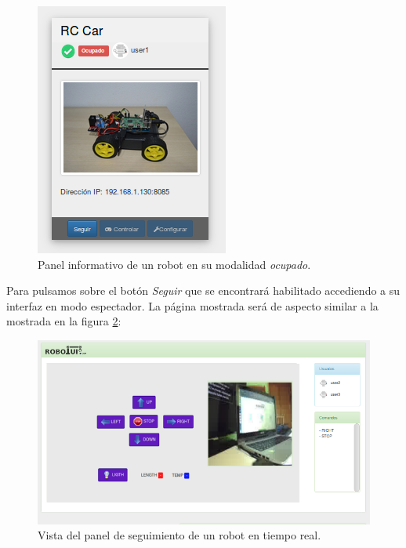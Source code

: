 \begin{figure}[H]
  \begin{center}
    \includegraphics[scale=.8]{imagenes/manual-usuario/tarjeta_ocupado.png}
  \end{center}
  \caption{ Panel informativo de un robot en su modalidad \emph{ocupado}.}
  \label{website:robot-ocupado}
\end{figure}

Para pulsamos sobre el botón \emph{Seguir} que se encontrará habilitado accediendo a su interfaz en modo espectador. La página mostrada será de aspecto similar a la mostrada en la figura \ref{website:ventana-seguimiento}:\\

\begin{figure}[H]
  \begin{center}
    \includegraphics[scale=.55]{imagenes/manual-usuario/vista_seguimiento.png}
  \end{center}
  \caption{ Vista del panel de seguimiento de un robot en tiempo real.}
  \label{website:ventana-seguimiento}
\end{figure}

